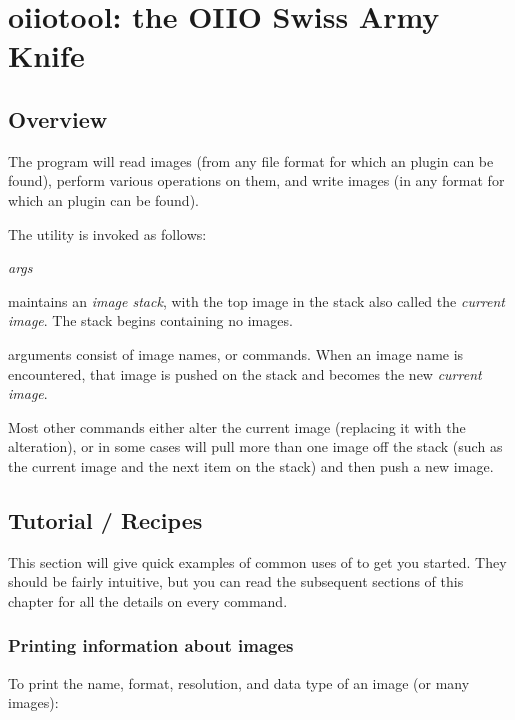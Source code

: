 \chapter{{\kw oiiotool}: the OIIO Swiss Army Knife}
\label{chap:oiiotool}

\section{Overview}


The \oiiotool program will read images (from any file format for which
an \ImageInput plugin can be found), perform various operations on them,
and write images (in any format for which an \ImageOutput plugin can be
found).

The \oiiotool utility is invoked as follows:

\medskip

\hspace{0.25in} \oiiotool \emph{args}

\medskip

\oiiotool maintains an \emph{image stack}, with the top image in the
stack also called the \emph{current image}.  The stack begins containing
no images.

\oiiotool arguments consist of image names, or commands.  When an
image name is encountered, that image is pushed on the stack and becomes
the new \emph{current image}.

Most other commands either alter the current image (replacing it with
the alteration), or in some cases will pull more than one image off the
stack (such as the current image and the next item on the stack) and
then push a new image.




\section{\oiiotool Tutorial / Recipes}

This section will give quick examples of common uses of \oiiotool to get
you started.  They should be fairly intuitive, but you can read the
subsequent sections of this chapter for all the details on every
command.

\subsection*{Printing information about images}

To print the name, format, resolution, and data type of an image
(or many images):

